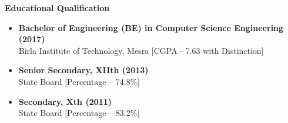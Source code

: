 \documentclass[a4paper,10pt]{article}
\begin{document}
\vspace{0.5cm}

\textbf{Educational Qualification}

\begin{itemize}
    \item \textbf{Bachelor of Engineering (BE) in Computer Science Engineering (2017)} \\ Birla Institute of Technology, Mesra [CGPA - 7.63 with Distinction]
    \item \textbf{Senior Secondary, XIIth (2013)} \\ State Board [Percentage – 74.8\%]
    \item \textbf{Secondary, Xth (2011)} \\ State Board [Percentage – 83.2\%]
\end{itemize}
\end{document}
